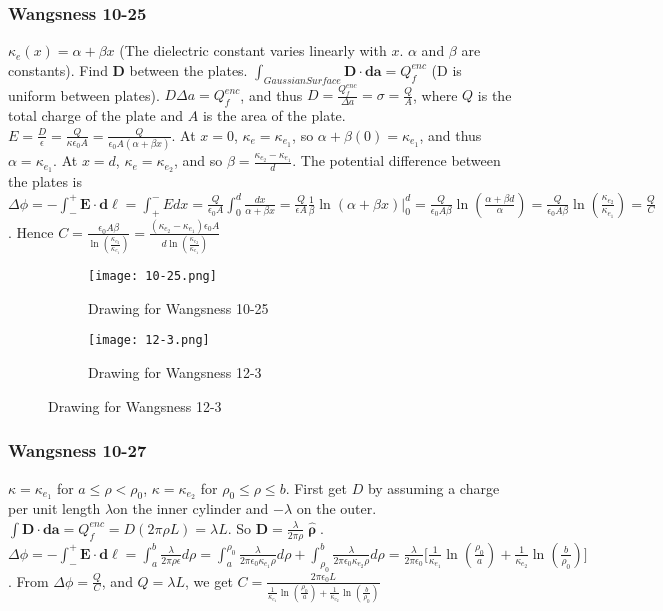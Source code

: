 \documentclass[crop=false,class=article,oneside]{standalone}
\begin{document}
        \subsubsection{Wangsness 10-25}
        $\kappa_e(x) = \alpha+\beta x$ (The dielectric constant varies linearly with $x$. $\alpha$ and $\beta$ are constants). Find $\mathbf{D}$ between the plates. $\int_{Gaussian Surface} \mathbf{D}\cdot \mathbf{da} = Q_f^{enc}$ (D is uniform between plates). $D\Delta a = Q_f^{enc}$, and thus $D = \frac{Q_f^{enc}}{\Delta a} = \sigma = \frac{Q}{A}$, where $Q$ is the total charge of the plate and $A$ is the area of the plate. $E = \frac{D}{\epsilon} = \frac{Q}{\kappa \epsilon_0 A} = \frac{Q}{\epsilon_0 A(\alpha + \beta x)}$. At $x=0$, $\kappa_e = \kappa_{e_1}$, so $\alpha+\beta(0) = \kappa_{e_1}$, and thus $\alpha = \kappa_{e_1}$. At $x=d$, $\kappa_{e} = \kappa_{e_2}$, and so $\beta = \frac{\kappa_{e_2}-\kappa_{e_1}}{d}$. The potential difference between the plates is $\Delta \phi = -\int_{-}^{+} \mathbf{E}\cdot \mathbf{d\ell} = \int_{+}^{-} Edx = \frac{Q}{\epsilon_0 A} \int_{0}^{d} \frac{dx}{\alpha+\beta x} = \frac{Q}{\epsilon A} \frac{1}{\beta} \ln(\alpha+\beta x)\big|_{0}^{d} = \frac{Q}{\epsilon_0 A\beta} \ln(\frac{\alpha+\beta d}{\alpha}) = \frac{Q}{\epsilon_0 A\beta} \ln(\frac{\kappa_{e_2}}{\kappa_{e_1}}) = \frac{Q}{C}$. Hence $C = \frac{\epsilon_0 A\beta}{\ln(\frac{\kappa_{e_2}}{\kappa_{e_1}})} = \frac{(\kappa_{e_2}-\kappa_{e_1})\epsilon_0 A}{d\ln(\frac{\kappa_{e_2}}{\kappa_{e_1}})}$
        \begin{figure}[H]
          \begin{subfigure}[b]{0.49\textwidth}
             \centering
            \texttt{[image: 10-25.png]}
            \caption{Drawing for Wangsness 10-25}
          \end{subfigure}
          \begin{subfigure}[b]{0.49\textwidth}
            \centering
            \texttt{[image: 12-3.png]}
            \caption{Drawing for Wangsness 12-3}
          \end{subfigure}
        \end{figure}
        \subsubsection{Wangsness 10-27}
        $\kappa = \kappa_{e_1}$ for $a\leq \rho < \rho_0$, $\kappa = \kappa_{e_2}$ for $\rho_0 \leq \rho \leq b$. First get $D$ by assuming a charge per unit length $\lambda $on the inner cylinder and $-\lambda$ on the outer. $\int \mathbf{D}\cdot \mathbf{da} = Q_{f}^{enc} = D(2\pi \rho L) = \lambda L$. So $\mathbf{D} = \frac{\lambda}{2\pi \rho} \hat{\boldsymbol{\uprho}}$. $\Delta \phi = -\int_{-}^{+} \mathbf{E} \cdot \mathbf{d\ell} = \int_{a}^{b} \frac{\lambda}{2\pi \rho \epsilon}d\rho = \int_{a}^{\rho_0} \frac{\lambda}{2\pi \epsilon_0 \kappa_{e_1}\rho}d\rho + \int_{\rho_0}^{b} \frac{\lambda}{2\pi \epsilon_0 \kappa_{e_2}\rho}d\rho = \frac{\lambda}{2\pi \epsilon_0}\big[\frac{1}{\kappa_{e_1}}\ln(\frac{\rho_0}{a}) + \frac{1}{\kappa_{e_2}}\ln(\frac{b}{\rho_0})\big]$. From $\Delta \phi = \frac{Q}{C}$, and $Q=\lambda L$, we get $C = \frac{2\pi \epsilon_0 L}{\frac{1}{\kappa_{e_1}}\ln(\frac{\rho_0}{a}) + \frac{1}{\kappa_{e_2}}\ln(\frac{b}{\rho_0})}$
\end{document}
